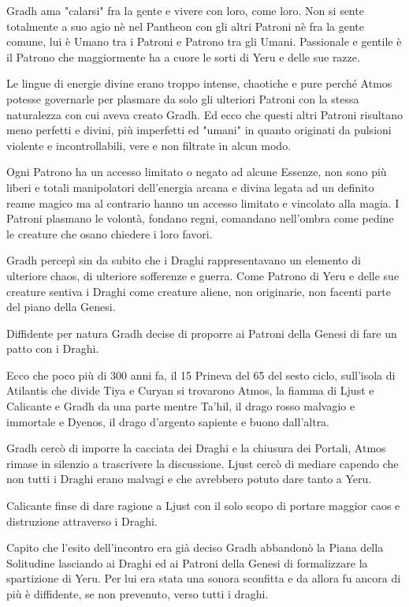 \documentclass[a4paper,11pt,twoside,openany]{book}
\begin{document}
Gradh ama "calarsi" fra la gente e vivere con loro, come loro.
Non si sente totalmente a suo agio nè nel Pantheon con gli altri Patroni nè fra la gente comune, lui è Umano tra i Patroni e Patrono tra gli Umani. Passionale e gentile è il Patrono che maggiormente ha a cuore le sorti di Yeru e delle sue razze.

Le lingue di energie divine erano troppo intense, chaotiche e pure perché Atmos potesse governarle per plasmare da solo gli ulteriori Patroni con la stessa naturalezza con cui aveva creato Gradh. Ed ecco che questi altri Patroni risultano meno perfetti e divini, più imperfetti ed "umani" in quanto originati da pulsioni violente e incontrollabili, vere e non filtrate in alcun modo.

Ogni Patrono ha un accesso limitato o negato ad alcune Essenze, non sono più liberi e totali manipolatori dell'energia arcana e divina legata ad un definito reame magico ma al contrario hanno un accesso limitato e vincolato alla magia.
I Patroni plasmano le volontà, fondano regni, comandano nell'ombra come pedine le creature che osano chiedere i loro favori.

Gradh percepì sin da subito che i Draghi rappresentavano un elemento di ulteriore chaos, di ulteriore sofferenze e guerra. Come Patrono di Yeru e delle sue creature sentiva i Draghi come creature aliene, non originarie, non facenti parte del piano della Genesi.

Diffidente per natura Gradh decise di proporre ai Patroni della Genesi di fare un patto con i Draghi.

Ecco che poco più di 300 anni fa, il 15 Prineva del 65 del sesto ciclo, sull'isola di Atilantis che divide Tiya e Curyan si trovarono Atmos, la fiamma di Ljust e Calicante e Gradh da una parte mentre Ta'hil, il drago rosso malvagio e immortale e Dyenos, il drago d'argento sapiente e buono dall'altra.

Gradh cercò di imporre la cacciata dei Draghi e la chiusura dei Portali, Atmos rimase in silenzio a trascrivere la discussione. Ljust cercò di mediare capendo che non tutti i Draghi erano malvagi e che avrebbero potuto dare tanto a Yeru.

Calicante finse di dare ragione a Ljust con il solo scopo di portare maggior caos e distruzione attraverso i Draghi.

Capito che l'esito dell'incontro era già deciso Gradh abbandonò la Piana della Solitudine lasciando ai Draghi ed ai Patroni della Genesi di formalizzare la spartizione di Yeru. Per lui era stata una sonora sconfitta e da allora fu ancora di più è diffidente, se non prevenuto, verso tutti i draghi.
\end{document}

